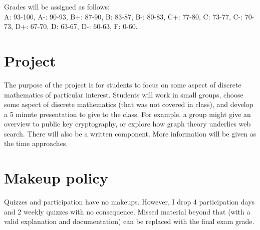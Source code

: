 \documentclass[letterpaper]{inzane_syllabus} %
\begin{document}
Grades will be assigned as follows: \\
A: 93-100, A-: 90-93, B+: 87-90, B: 83-87, B-: 80-83, C+: 77-80, C: 73-77, C-: 70-73, D+: 67-70, D: 63-67, D-: 60-63, F: 0-60.




\vspace{0.4cm}
\section{Project} 

The purpose of the project is for students to focus on some aspect of discrete mathematics of particular interest.  Students will work in small groups, choose some aspect of discrete mathematics (that was not covered in class), and develop a 5 minute presentation to give to the class.   For example, a group might give an overview to public key cryptography, or explore how graph theory underlies web search.   There will also be a written component. More information will be given as the time approaches.


\vspace{0.4cm}
\section{Makeup policy}

Quizzes and participation have no makeups. However, I drop 4 participation days and 2 weekly quizzes with no consequence. Missed material beyond that (with a valid explanation and documentation) can be replaced with the final exam grade.
\end{document}
